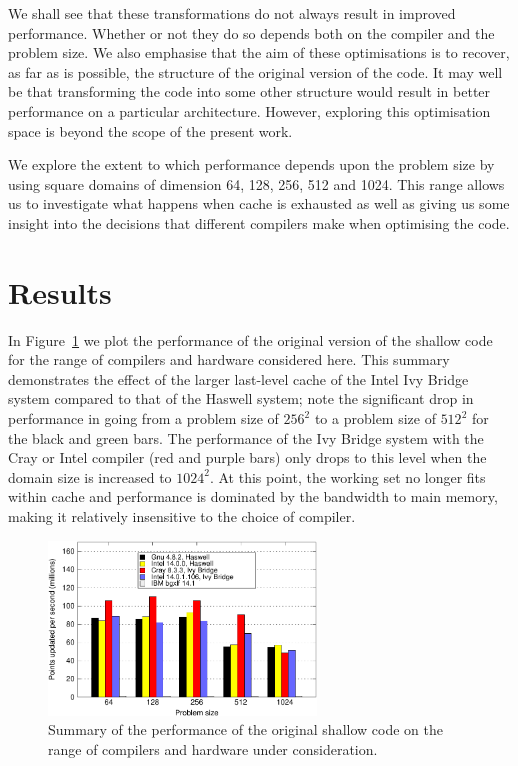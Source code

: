 \documentclass[journal]{IEEEtran}
\begin{document}
We shall see that these transformations do not always result in improved
performance. Whether or not they do so depends both on the compiler
and the problem size. We also emphasise that the aim of these
optimisations is to recover, as far as is possible, the structure of
the original version of the code. It may well be that transforming the
code into some other structure would result in better performance on a
particular architecture. However, exploring this optimisation space is
beyond the scope of the present work.

We explore the extent to which performance depends upon the problem
size by using square domains of dimension 64, 128, 256, 512 and
1024. This range allows us to investigate what happens when cache is
exhausted as well as giving us some insight into the decisions that
different compilers make when optimising the code.

\section{Results}

In Figure~\ref{FIG_orig_perf_summary} we plot the performance of the
original version of the shallow code for the range of compilers and
hardware considered here. This summary demonstrates the effect of the
larger last-level cache of the Intel Ivy Bridge system compared to
that of the Haswell system; note the significant drop in performance
in going from a problem size of $256^{2}$ to a problem size of
$512^{2}$ for the black and green bars. The performance of the Ivy
Bridge system with the Cray or Intel compiler (red and purple bars)
only drops to this level when the domain size is increased to
$1024^{2}$. At this point, the working set no longer fits within cache
and performance is dominated by the bandwidth to main memory, making
it relatively insensitive to the choice of compiler.

\begin{figure}[!t]
\centering
\includegraphics[width=2.8in]{orig_summary}
\caption{Summary of the performance of the original shallow code on 
the range of compilers and hardware under consideration.}
\label{FIG_orig_perf_summary}
\end{figure}
\end{document}
